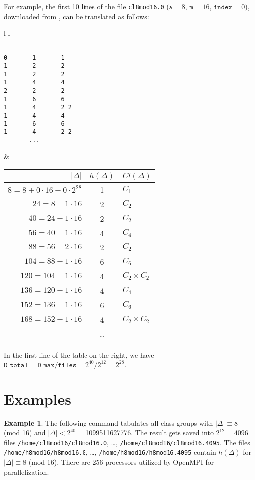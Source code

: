\documentclass[a4paper,10pt]{article}
\newcommand{\code}{\lstinline}
\begin{document}
For example, the first 10 lines of the file \code{cl8mod16.0} ($\texttt{a}=8$, $\texttt{m}=16$, $\texttt{index}=0$), downloaded from \cite{lmfdb}, can be translated as follows:
\begin{center}
\begin{tabular}{l l}
\begin{lstlisting}

0       1       1
1       2       2
1       2       2
1       4       4
2       2       2
1       6       6
1       4       2 2
1       4       4
1       6       6
1       4       2 2
       ...
\end{lstlisting}
&
\begin{tabular}{| r | c | l |}
\hline
$|\Delta|$ & $h(\Delta)$ & $Cl(\Delta)$\\
\hline
\hline
$8 = 8 + 0 \cdot 16 + 0 \cdot 2^{28}$		& 1	& $C_1$\\
$24 = 8 + 1\cdot 16$		& 2	& $C_2$\\
$40 = 24 + 1 \cdot 16$	& 2	& $C_2$\\
$56 = 40 + 1 \cdot 16$	& 4	& $C_4$\\
$88 = 56 + 2 \cdot 16$	& 2	& $C_2$\\
$104 = 88 + 1 \cdot 16$	& 6	& $C_6$\\
$120 = 104 + 1 \cdot 16$	& 4	& $C_2 \times C_2$\\
$136 = 120 + 1 \cdot 16$	& 4	& $C_4$\\
$152 = 136 + 1 \cdot 16$	& 6	& $C_6$\\
$168 = 152 + 1 \cdot 16$	& 4	& $C_2 \times C_2$\\
& \ldots &\\
\hline
\end{tabular}
\end{tabular}
\end{center}

In the first line of the table on the right, we have $\texttt{D\_total} = \texttt{D\_max} / \texttt{files} = 2^{40} / 2^{12} = 2^{28}$.





\section{Examples} \label{subsec:clgrp_examples}

\textbf{Example 1}. The following command tabulates all class groups with $|\Delta| \equiv 8$ (mod 16) and \mbox{$|\Delta| < 2^{40}$} = 1099511627776. The result gets saved into $2^{12}=4096$ files \code{/home/cl8mod16/cl8mod16.0}, \ldots, \code{/home/cl8mod16/cl8mod16.4095}. The files \code{/home/h8mod16/h8mod16.0}, \ldots, \code{/home/h8mod16/h8mod16.4095} contain $h(\Delta)$ for $|\Delta| \equiv 8$ (mod 16). There are 256 processors utilized by OpenMPI for parallelization.
\end{document}

